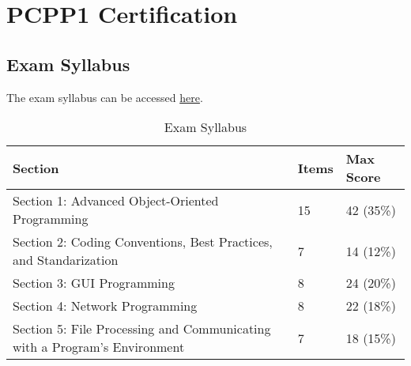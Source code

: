 \section{PCPP1 Certification}
\subsection{Exam Syllabus}
%

The exam syllabus can be accessed \href{https://pythoninstitute.org/assets/628def5091da2303121759.pdf}{here}.

\begin{table}[htbp]
    \centering
    \begin{tabular}{lll} %
        \toprule
        \textbf{Section} & \textbf{Items} & \textbf{Max Score} \\
        \midrule
        Section 1: Advanced Object-Oriented Programming & 15 & 42 (35\%) \\
        Section 2: Coding Conventions, Best Practices, and Standarization  & 7 & 14 (12\%) \\
        Section 3: GUI Programming & 8 & 24 (20\%) \\
        Section 4: Network Programming & 8 & 22 (18\%) \\
        Section 5: File Processing and Communicating with a Program’s Environment & 7 & 18 (15\%) \\
        \bottomrule
    \end{tabular}
    \caption{Exam Syllabus}
    \label{tab:exam_sections}
\end{table}


%